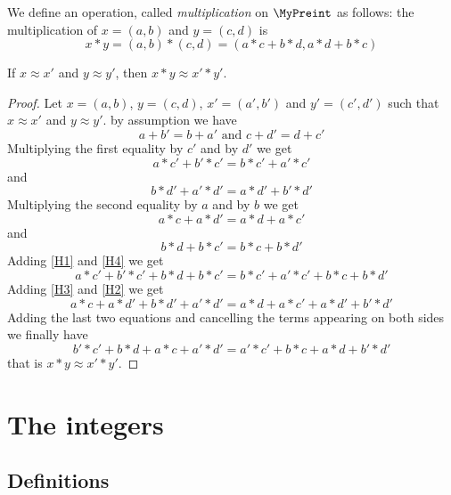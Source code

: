 \begin{definition}
    \label{MyPreint.mul}
    \leanok
We define an operation, called \emph{multiplication} on $\MyPreint$ as follows: the multiplication of $x = (a,b)$ and $y = (c, d)$ is
\[
x * y = (a,b) * (c,d) = (a*c+b*d, a*d+b*c)
\]
\end{definition}

\begin{lemma}
    \label{MyPreint.mul_quotient}
    \leanok
If $x \approx x'$ and $y \approx y'$, then $x * y \approx x' * y'$.
\end{lemma}
\begin{proof}
\leanok
Let $x = (a,b)$, $y = (c,d)$, $x' = (a',b')$ and $y' = (c',d')$ such that $x \approx x'$ and $y \approx y'$. by assumption we have
\[
a + b' = b + a' \mbox{ and } c + d' = d + c'
\]
Multiplying the first equality by $c'$ and by $d'$ we get
\begin{equation} \label{H1}
a * c' + b' * c' = b * c' + a' * c'
\end{equation}
and
\begin{equation} \label{H2}
b * d' + a' * d' = a * d' + b' * d'
\end{equation}
Multiplying the second equality by $a$ and by $b$ we get
\begin{equation} \label{H3}
a * c + a * d' = a * d + a * c'
\end{equation}
and
\begin{equation} \label{H4}
b * d + b * c' = b * c + b * d'
\end{equation}
Adding \eqref{H1} and \eqref{H4} we get
\[
a * c' + b' * c' + b * d + b * c' = b * c' + a' * c' + b * c + b * d'
\]
Adding \eqref{H3} and \eqref{H2} we get
\[
 a * c + a * d' + b * d' + a' * d' = a * d + a * c' + a * d' + b' * d'
\]
Adding the last two equations and cancelling the terms appearing on both sides we finally have
\[
b' * c' + b * d + a * c + a' * d' =  a' * c' + b * c + a * d + b' * d'
\]
that is $x * y \approx  x'*y'$.
\end{proof}

\section{The integers}

\subsection{Definitions}

